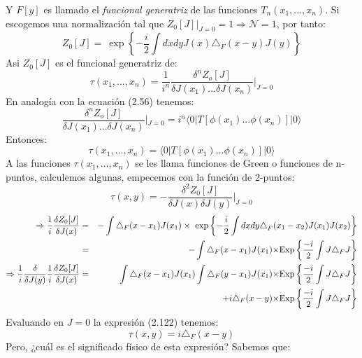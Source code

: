 Y $F[y]$ es llamado el \textit{funcional generatriz} de las funciones  $T_{n}(x_{1},...,x_{n})$. Si escogemos una normalización tal que $Z_0[J]|_{J=0}=1 \Rightarrow \mathcal{N}=1$, por tanto:
\begin{equation}
Z_{0}[J]=\ \exp\left\{ -\frac{i}{2}\int dxdyJ(x)\triangle_{F}(x-y)J(y)\right\} 
\end{equation}
Asi $Z_0[J]$ es el funcional generatriz de:
\begin{equation}
\tau(x_{1},...,x_{n})=\frac{1}{i^{n}}\frac{\delta^{n}Z_{o}[J]}{\delta J(x_{1})...\delta J(x_{n})}|_{J=0}
\end{equation}
En analogía con la ecuación (2.56) tenemos:
\begin{equation}
\frac{\delta^{n}Z_{o}[J]}{\delta J(x_{1})...\delta J(x_{n})}|_{J=0}=i^{n}\langle0|T[\phi(x_{1})...\phi(x_{n})]|0\rangle
\end{equation}
Entonces:
\begin{equation}
\tau(x_1,...,x_n)=\langle0|T[\phi(x_{1})...\phi(x_{n})]|0\rangle
\end{equation}
A las funciones $\tau(x_1,...,x_n)$ se les llama funciones de Green o funciones de n-puntos, calculemos algunas, empecemos con la función de 2-puntos:
\begin{equation}
\tau(x,y)=-\frac{\delta^2Z_0[J]}{\delta J(x)\delta J(y)}|_{J=0}
\end{equation}
\begin{eqnarray}
\nonumber \Rightarrow \frac{1}{i}\frac{\delta Z_{0}[J]}{\delta J(x)}&=&-\int\triangle_{F}(x-x_{1})J(x_{1})\times\ \exp\left\{ -\frac{i}{2}\int dxdy\text{\ensuremath{\triangle}}_{F}(x_{1}-x_{2})J(x_{1})J(x_{2})\right\}\\
\nonumber &=& -\int\triangle_{F}(x-x_{1})J(x_{1})\text{\ensuremath{\times}Exp}\left\{ \frac{-i}{2}\int J\triangle_{F}J\right\}\\ 
\nonumber \Rightarrow \frac{1}{i}\frac{\delta}{\delta J(y)}\frac{1}{i}\frac{\delta Z_{0}[J]}{\delta J(x)}&=&\int\triangle_{F}(x-x_{1})J(x_{1})\int\triangle_{F}(y-x_{1})J(x_{1})\text{\ensuremath{\times}Exp}\left\{ \frac{-i}{2}\int J\triangle_{F}J\right\}\\
&&+ i\triangle_{F}(x-y)\text{\ensuremath{\times}Exp}\left\{ \frac{-i}{2}\int J\triangle_{F}J\right\}
\end{eqnarray}
Evaluando en $J=0$ la expresión (2.122) tenemos:
\begin{equation}
\tau(x,y)=i\triangle_F(x-y)
\end{equation}
Pero, ¿cuál es el significado físico de esta expresión? Sabemos que:
